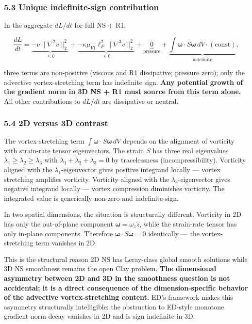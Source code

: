 \documentclass[
]{article}
\begin{document}
\subsubsection{5.3 Unique indefinite-sign
contribution}\label{unique-indefinite-sign-contribution}

In the aggregate \(dL/dt\) for full NS + R1,

\[\frac{dL}{dt} = \underbrace{-\nu\|\nabla^2 v\|_2^2}_{\le 0} + \underbrace{-\kappa\mu_{V1}\ell_P^2 \|\nabla^3 v\|_2^2}_{\le 0} + \underbrace{0}_\text{pressure} + \underbrace{\int \boldsymbol{\omega} \cdot S\boldsymbol{\omega} \, dV \cdot (\mathrm{const})}_\text{indefinite},\]

three terms are non-positive (viscous and R1 dissipative; pressure
zero); only the advective vortex-stretching term has indefinite sign.
\textbf{Any potential growth of the gradient norm in 3D NS + R1 must
source from this term alone.} All other contributions to \(dL/dt\) are
dissipative or neutral.

\subsubsection{5.4 2D versus 3D contrast}\label{d-versus-3d-contrast}

The vortex-stretching term
\(\int \boldsymbol{\omega} \cdot S\boldsymbol{\omega} \, dV\) depends on
the alignment of vorticity with strain-rate tensor eigenvectors. The
strain \(S\) has three real eigenvalues
\(\lambda_1 \ge \lambda_2 \ge \lambda_3\) with
\(\lambda_1 + \lambda_2 + \lambda_3 = 0\) by tracelessness
(incompressibility). Vorticity aligned with the
\(\lambda_1\)-eigenvector gives positive integrand locally --- vortex
stretching amplifies vorticity. Vorticity aligned with the
\(\lambda_3\)-eigenvector gives negative integrand locally --- vortex
compression diminishes vorticity. The integrated value is generically
non-zero and indefinite-sign.

In two spatial dimensions, the situation is structurally different.
Vorticity in 2D has only the out-of-plane component
\(\boldsymbol{\omega} = \omega_z \hat{z}\), while the strain-rate tensor
has only in-plane components. Therefore
\(\boldsymbol{\omega} \cdot S\boldsymbol{\omega} = 0\) identically ---
the vortex-stretching term vanishes in 2D.

This is the structural reason 2D NS has Leray-class global smooth
solutions while 3D NS smoothness remains the open Clay problem.
\textbf{The dimensional asymmetry between 2D and 3D in the smoothness
question is not accidental; it is a direct consequence of the
dimension-specific behavior of the advective vortex-stretching content.}
ED's framework makes this asymmetry structurally intelligible: the
obstruction to ED-style monotone gradient-norm decay vanishes in 2D and
is sign-indefinite in 3D.
\end{document}
